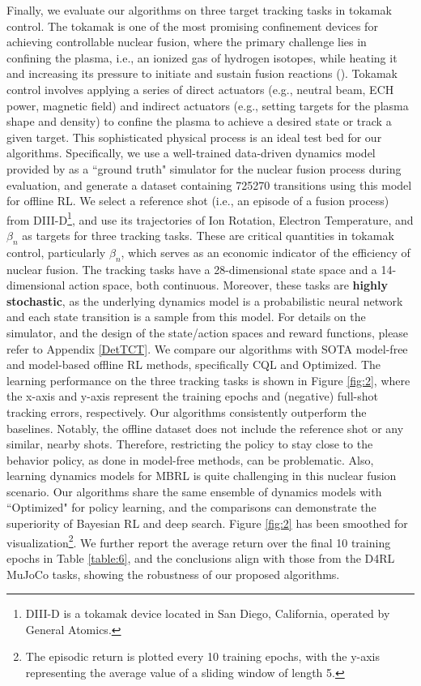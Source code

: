 Finally, we evaluate our algorithms on three target tracking tasks in tokamak control. The tokamak is one of the most promising confinement devices for achieving controllable nuclear fusion, where the primary challenge lies in confining the plasma, i.e., an ionized gas of hydrogen isotopes, while heating it and increasing its pressure to initiate and sustain fusion reactions (\cite{1512794}). Tokamak control involves applying a series of direct actuators (e.g., neutral beam, ECH power, magnetic field) and indirect actuators (e.g., setting targets for the plasma shape and density) to confine the plasma to achieve a desired state or track a given target. This sophisticated physical process is an ideal test bed for our algorithms. Specifically, we use a well-trained data-driven dynamics model provided by \cite{DBLP:journals/corr/abs-2404-12416} as a ``ground truth" simulator for the nuclear fusion process during evaluation, and generate a dataset containing 725270 transitions using this model for offline RL. We select a reference shot (i.e., an episode of a fusion process) from DIII-D\footnote{DIII-D is a tokamak device located in San Diego, California, operated by General Atomics.}, and use its trajectories of Ion Rotation, Electron Temperature, and $\beta_n$ as targets for three tracking tasks. These are critical quantities in tokamak control, particularly $\beta_n$, which serves as an economic indicator of the efficiency of nuclear fusion. The tracking tasks have a 28-dimensional state space and a 14-dimensional action space, both continuous. Moreover, these tasks are \textbf{highly stochastic}, as the underlying dynamics model is a probabilistic neural network and each state transition is a sample from this model. For details on the simulator, and the design of the state/action spaces and reward functions, please refer to Appendix \ref{DetTCT}. We compare our algorithms with SOTA model-free and model-based offline RL methods, specifically CQL and Optimized. The learning performance on the three tracking tasks is shown in Figure \ref{fig:2}, where the x-axis and y-axis represent the training epochs and (negative) full-shot tracking errors, respectively. Our algorithms consistently outperform the baselines. Notably, the offline dataset does not include the reference shot or any similar, nearby shots. Therefore, restricting the policy to stay close to the behavior policy, as done in model-free methods, can be problematic. Also, learning dynamics models for MBRL is quite challenging in this nuclear fusion scenario. Our algorithms share the same ensemble of dynamics models with ``Optimized" for policy learning, and the comparisons can demonstrate the superiority of Bayesian RL and deep search. Figure \ref{fig:2} has been smoothed for visualization\footnote{The episodic return is plotted every 10 training epochs, with the y-axis representing the average value of a sliding window of length 5.}. We further report the average return over the final 10 training epochs in Table \ref{table:6}, and the conclusions align with those from the D4RL MuJoCo tasks, showing the robustness of our proposed algorithms.

